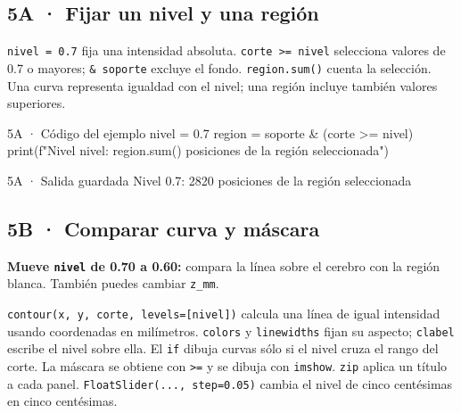 
\subsection*{5A · Fijar un nivel y una región}

\label{vivo:5a}

\texttt{\small nivel = 0.\allowbreak{}7} fija una intensidad absoluta. \texttt{\small corte >= nivel} selecciona valores de 0.7 o mayores; \texttt{\small \& soporte} excluye el fondo. \texttt{\small region.\allowbreak{}sum(\allowbreak{})\allowbreak{}} cuenta la selección. Una curva representa igualdad con el nivel; una región incluye también valores superiores.

\begin{CodigoVivo}{5A · Código del ejemplo}
nivel = 0.7
region = soporte & (corte >= nivel)
print(f"Nivel {nivel}: {region.sum()} posiciones de la región seleccionada")
\end{CodigoVivo}


\begin{Salida}{5A · Salida guardada}
Nivel 0.7: 2820 posiciones de la región seleccionada
\end{Salida}



\subsection*{5B · Comparar curva y máscara}

\label{vivo:5b}

\textbf{Mueve \texttt{\small nivel} de 0.70 a 0.60:} compara la línea sobre el cerebro con la región blanca. También puedes cambiar \texttt{\small z\_mm}.

\texttt{\small contour(\allowbreak{}x,\allowbreak{} y,\allowbreak{} corte,\allowbreak{} levels=[nivel])\allowbreak{}} calcula una línea de igual intensidad usando coordenadas en milímetros. \texttt{\small colors} y \texttt{\small linewidths} fijan su aspecto; \texttt{\small clabel} escribe el nivel sobre ella. El \texttt{\small if} dibuja curvas sólo si el nivel cruza el rango del corte. La máscara se obtiene con \texttt{\small >=} y se dibuja con \texttt{\small imshow}. \texttt{\small zip} aplica un título a cada panel. \texttt{\small FloatSlider(\allowbreak{}.\allowbreak{}.\allowbreak{}.\allowbreak{},\allowbreak{} step=0.\allowbreak{}05)\allowbreak{}} cambia el nivel de cinco centésimas en cinco centésimas.

